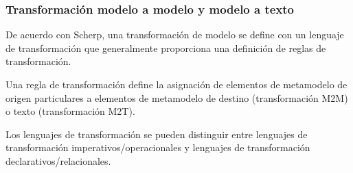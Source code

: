 \subsubsection*{Transformación modelo a modelo y modelo a texto}


De acuerdo con Scherp\cite{scherp_framework_2013}, una transformación de modelo se define con un lenguaje de transformación que generalmente proporciona una definición de reglas de transformación.

Una regla de transformación define la asignación de elementos de metamodelo de origen particulares a elementos de metamodelo de destino (transformación M2M) o texto (transformación M2T).

Los lenguajes de transformación se pueden distinguir entre lenguajes de transformación imperativos/operacionales y lenguajes de transformación declarativos/relacionales.


